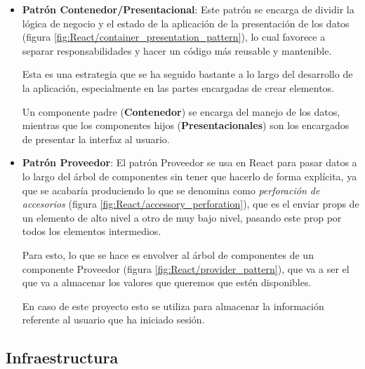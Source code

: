 \begin{itemize}
	\item \textbf{Patrón Contenedor/Presentacional}: Este patrón se encarga de dividir la lógica de negocio y el estado de la aplicación de la presentación de los datos (figura \ref{fig:React/container_presentation_pattern}), lo cual favorece a separar responsabilidades y hacer un código más reusable y mantenible. 

	Esta es una estrategia que se ha seguido bastante a lo largo del desarrollo de la aplicación, especialmente en las partes encargadas de crear elementos. 
	
	Un componente padre (\textbf{Contenedor}) se encarga del manejo de los datos, mientras que los componentes hijos (\textbf{Presentacionales}) son los encargados de presentar la interfaz al usuario.
	
	
	\item \textbf{Patrón Proveedor}: El patrón Proveedor se usa en React para pasar datos a lo largo del árbol de componentes sin tener que hacerlo de forma explícita, ya que se acabaría produciendo lo que se denomina como \textit{perforación de accesorios} (figura \ref{fig:React/accessory_perforation}), que es el enviar props de un elemento de alto nivel a otro de muy bajo nivel, pasando este prop por todos los elementos intermedios. 
	

	Para esto, lo que se hace es envolver al árbol de componentes de un componente Proveedor (figura \ref{fig:React/provider_pattern}), que va a ser el que va a almacenar los valores que queremos que estén disponibles. 
	
	
	En caso de este proyecto esto se utiliza para almacenar la información referente al usuario que ha iniciado sesión.
\end{itemize}

\subsection{Infraestructura}

